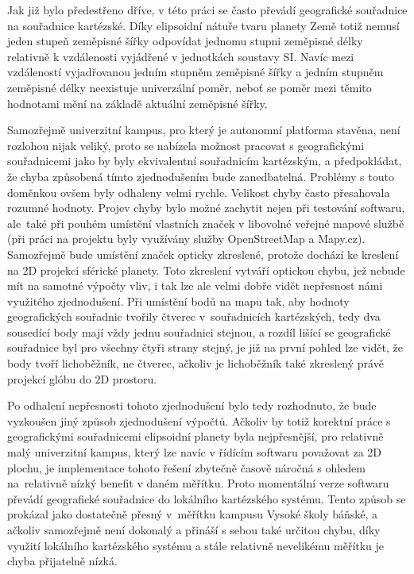 \documentclass[czech, bachelor]{diploma}
\begin{document}
Jak již bylo předestřeno dříve, v této práci se často převádí geografické souřadnice na souřadnice kartézské. Díky elipsoidní
nátuře tvaru planety Země totiž nemusí jeden stupeň zeměpisné šířky odpovídat jednomu stupni zeměpisné délky relativně
k vzdálenosti vyjádřené v jednotkách soustavy SI. Navíc mezi vzdáleností vyjadřovanou jedním stupněm zeměpisné šířky a jedním
stupněm zeměpisné délky neexistuje univerzální poměr, neboť se poměr mezi těmito hodnotami mění na základě aktuální zeměpisné
šířky.

Samozřejmě univerzitní kampus, pro který je autonomní platforma stavěna, není rozlohou nijak veliký, proto se nabízela možnost
pracovat s geografickými souřadnicemi jako by byly ekvivalentní souřadnicím kartézským, a předpokládat, že chyba způsobená tímto
zjednodušením bude zanedbatelná. Problémy s touto doměnkou ovšem byly odhaleny velmi rychle. Velikost chyby často přesahovala
rozumné hodnoty. Projev chyby bylo možné zachytit nejen při testování softwaru, ale~také při pouhém umístění vlastních značek
v libovolné veřejné mapové službě (při práci na projektu byly využívány služby OpenStreetMap\cite{openstreetmap-source} a
Mapy.cz\cite{mapycz-source}). Samozřejmě bude umístění značek opticky zkreslené, protože dochází ke kreslení na 2D projekci
sférické planety. Toto zkreslení vytváří optickou chybu, jež nebude mít na samotné výpočty vliv, i tak lze ale velmi dobře vidět
nepřesnost námi využitého zjednodušení. Při umístění bodů na mapu tak, aby hodnoty geografických souřadnic tvořily čtverec
v~souřadnicích kartézských, tedy dva sousedící body mají vždy jednu souřadnici stejnou, a rozdíl lišící se geografické souřadnice
byl pro všechny čtyři strany stejný, je již na první pohled lze vidět, že body tvoří lichoběžník, ne čtverec, ačkoliv
je lichoběžník také zkreslený právě projekcí glóbu do 2D prostoru.

Po odhalení nepřesnosti tohoto zjednodušení bylo tedy rozhodnuto, že bude vyzkoušen jiný způsob zjednodušení výpočtů. Ačkoliv by
totiž korektní práce s geografickými souřadnicemi elipsoidní planety byla nejpřesnější, pro relativně malý univerzitní kampus,
který lze navíc v řídícím softwaru považovat za 2D plochu, je implementace tohoto řešení zbytečně časově náročná s ohledem
na~relativně nízký benefit v daném měřítku. Proto momentální verze softwaru převádí geografické souřadnice do lokálního
kartézského systému. Tento způsob se prokázal jako dostatečně přesný v~měřítku kampusu Vysoké školy báňské, a ačkoliv samozřejmě
není dokonalý a přináší s sebou také určitou chybu, díky využití lokálního kartézského systému a stále relativně nevelikému
měřítku je chyba přijatelně nízká.
\end{document}
